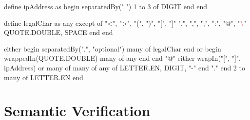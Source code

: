 \begin{rexregexBox}[float=htbp,title={RexRegex code for validating email addresses},breakable,label=code:emailPattern,width=12cm,center,listing options={style=rexregex,basicstyle=\small\ttfamily, mathescape=true}]
define ipAddress as
    begin separatedBy(".")
        1 to 3 of DIGIT
    end
end

define legalChar as
    any except of
        "<", ">", "(", ")", "[", "]"
        ".", ",", ";", ":", "@", "${\textcolor{Firebrick3!90!white}{\text{\textbackslash}}}$"
        QUOTE.DOUBLE, SPACE
    end
end

either
    begin separatedBy(".", "optional")
        many of legalChar
    end
or
    begin wrappedIn(QUOTE.DOUBLE)
        many of any
    end
end
"@"
either
    wrapIn("[", "]", ipAddress)
or
    many of
        many of
            any of LETTER.EN, DIGIT, "-"
        end
        "."
    end
    2 to many of LETTER.EN
end
\end{rexregexBox}

{
\hypersetup{citecolor=white}
\begin{listingBox}[float=htb,title={Regex for validating email addresses \cite{EmailRegex}},label=code:emailRegex]
    
\end{listingBox}
}

\section{Semantic Verification} \label{sec:verification}


